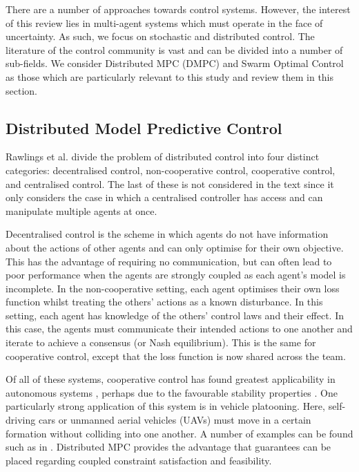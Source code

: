 \documentclass[.../main.tex]{subfiles}
\begin{document}
There are a number of approaches towards control systems. However, the interest of this review lies
in multi-agent systems which must operate in the face of uncertainty. As such, we focus on
stochastic and distributed control. The literature of the control community is vast and can be
divided into a number of sub-fields. We consider Distributed MPC (DMPC) and Swarm Optimal Control as
those which are particularly relevant to this study and review them in this section.

\subsection{Distributed Model Predictive Control} \label{sec::Distributed_MPC}

Rawlings et al. \cite{rawlings2017model} divide the problem of distributed control into four distinct
categories: decentralised control, non-cooperative control, cooperative control, and centralised
control. The last of these is not considered in the text since it only considers the case in which a
centralised controller has access and can manipulate multiple agents at once. 

Decentralised control is the scheme in which agents do not have information about the actions of
other agents and can only optimise for their own objective. This has the advantage of requiring no
communication, but can often lead to poor performance when the agents are strongly coupled as each
agent’s model is incomplete. In the non-cooperative setting, each agent optimises their own loss
function whilst treating the others’ actions as a known disturbance. In this setting, each agent has
knowledge of the others’ control laws and their effect. In this case, the agents must communicate
their intended actions to one another and iterate to achieve a consensus (or Nash equilibrium). This
is the same for cooperative control, except that the loss function is now shared across the team. 

Of all of these systems, cooperative control has found greatest applicability in autonomous systems
\cite{Negenborn2014}, perhaps due to the favourable stability properties \cite{Venkat2006}. One
particularly strong application of this system is in vehicle platooning. Here, self-driving cars or
unmanned aerial vehicles (UAVs) must move in a certain formation without colliding into one another.
A number of examples can be found such as in \cite{Liu2019, VanParys2017, Zheng2017}. Distributed
MPC provides the advantage that guarantees can be placed regarding coupled constraint satisfaction
and feasibility.
\end{document}

